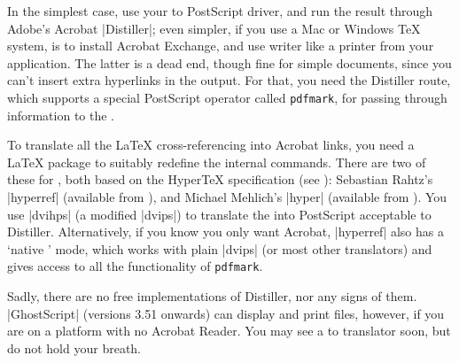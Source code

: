 
In the simplest case, use your  to PostScript driver, and run the
result through Adobe's Acrobat \ProgName|Distiller|; even simpler, if
you use a Mac or Windows \TeX{} system, is to install Acrobat Exchange,
and use writer like a printer from your application. The latter is
a dead end, though fine for simple documents, since you can't insert
extra hyperlinks in the  output. For that, you need the
Distiller route, which supports a special PostScript operator called
\texttt{pdfmark}, for passing through information to the . 

To translate all the \LaTeX{} cross-referencing into Acrobat
links, you need a \LaTeX{} package to suitably redefine
the internal commands.  There are two of these for \LaTeXe{}, both
based on the Hyper\TeX{} specification 
(see ):
Sebastian Rahtz's \Package|hyperref| (available from
), and Michael Mehlich's
\Package|hyper| (available from ). You use
\ProgName|dvihps| (a modified \ProgName|dvips|)
to translate the  into PostScript acceptable to
Distiller.  Alternatively, if you know you only want Acrobat,
\Package|hyperref| also has a `native ' mode, which works with
plain \ProgName|dvips| (or most other translators) and gives access to
all the functionality of \texttt{pdfmark}.

Sadly, there are no free implementations of Distiller, nor any signs
of them.  \ProgName|GhostScript| (versions 3.51 onwards) can display
and print  files, however, if you are on a platform with no Acrobat
Reader. You may see a  to  translator soon, but do not hold
your breath.


\section{\MF{}}


